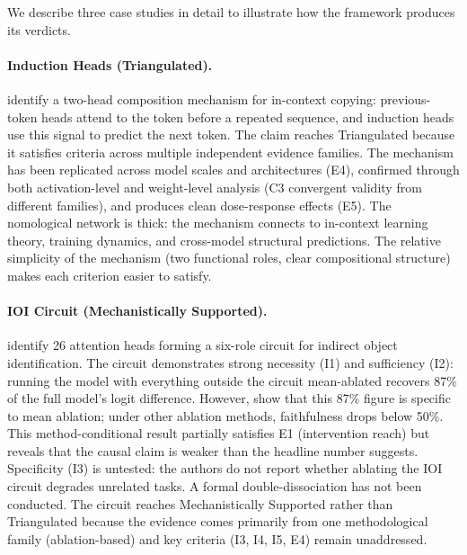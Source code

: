 \documentclass[10pt]{article}
\begin{document}
We describe three case studies in detail to illustrate how the framework produces its verdicts.

\paragraph{Induction Heads (Triangulated).} \citet{olsson2022context} identify a two-head composition mechanism for in-context copying: previous-token heads attend to the token before a repeated sequence, and induction heads use this signal to predict the next token. The claim reaches Triangulated because it satisfies criteria across multiple independent evidence families. The mechanism has been replicated across model scales and architectures (E4), confirmed through both activation-level and weight-level analysis (C3 convergent validity from different families), and produces clean dose-response effects (E5). The nomological network is thick: the mechanism connects to in-context learning theory, training dynamics, and cross-model structural predictions. The relative simplicity of the mechanism (two functional roles, clear compositional structure) makes each criterion easier to satisfy.

\paragraph{IOI Circuit (Mechanistically Supported).} \citet{wang2023interpretability} identify 26 attention heads forming a six-role circuit for indirect object identification. The circuit demonstrates strong necessity (I1) and sufficiency (I2): running the model with everything outside the circuit mean-ablated recovers 87\% of the full model's logit difference. However, \citet{miller2024transformer} show that this 87\% figure is specific to mean ablation; under other ablation methods, faithfulness drops below 50\%. This method-conditional result partially satisfies E1 (intervention reach) but reveals that the causal claim is weaker than the headline number suggests. Specificity (I3) is untested: the authors do not report whether ablating the IOI circuit degrades unrelated tasks. A formal double-dissociation has not been conducted. The circuit reaches Mechanistically Supported rather than Triangulated because the evidence comes primarily from one methodological family (ablation-based) and key criteria (I3, I4, I5, E4) remain unaddressed.
\end{document}
